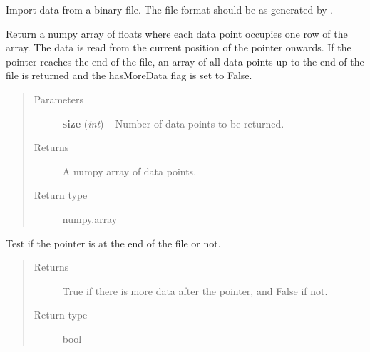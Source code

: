 \documentclass[letterpaper,10pt,english]{sphinxmanual}
\begin{document}
\begin{fulllineitems}
\label{common:common_data_importer.CommonBinaryFileDataImporter}
Import data from a binary file. The file format should be as generated by .

\begin{fulllineitems}
\label{common:common_data_importer.CommonBinaryFileDataImporter.get_data}
Return a numpy array of floats where each data point occupies one row of the array. The data is read from
the current position of the pointer onwards. If the pointer reaches the end of the file, an array of all data
points up to the end of the file is returned and the hasMoreData flag is set to False.
\begin{quote}\begin{description}
\item[{Parameters}] \leavevmode
\textbf{size} (\emph{int}) -- Number of data points to be returned.

\item[{Returns}] \leavevmode
A numpy array of data points.

\item[{Return type}] \leavevmode
numpy.array

\end{description}\end{quote}

\end{fulllineitems}


\begin{fulllineitems}
\label{common:common_data_importer.CommonBinaryFileDataImporter.has_more_data}
Test if the pointer is at the end of the file or not.
\begin{quote}\begin{description}
\item[{Returns}] \leavevmode
True if there is more data after the pointer, and False if not.

\item[{Return type}] \leavevmode
bool

\end{description}\end{quote}


\end{fulllineitems}
\end{fulllineitems}
\end{document}
